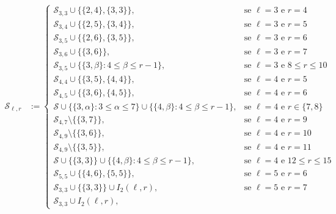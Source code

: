 \documentclass[12pt,a4paper]{book}
\begin{document}
\begin{equation*}%
    \begin{aligned}
        \mathcal{S}_{\ell, r}
            &:=
    \begin{cases}
        \mathcal{S}_{3,3} \cup \{\{2,4\}, \{3,3\}\}, 
        & \text{se } \ell=3 \text{ e } r=4   \\ 
        \mathcal{S}_{3,4} \cup \{\{2,5\}, \{3,4\}\}, 
        & \text{se } \ell=3 \text{ e } r=5    \\ 
        \mathcal{S}_{3,5} \cup \{\{2,6\}, \{3,5\}\}, 
        & \text{se } \ell=3 \text{ e } r=6    \\ 
         \mathcal{S}_{3,6} \cup \{\{3,6\}\}, 
        & \text{se } \ell=3 \text{ e } r=7    \\ 
        \mathcal{S}_{3,5} \cup \{\{3,\beta\}: 4 \leq \beta \leq r-1\}, & \text{se } \ell =3 \text{ e } 8\leq r \leq 10 \\
         \mathcal{S}_{4,4} \cup \{\{3,5\}, \{4,4\}\}, 
        & \text{se } \ell=4 \text{ e } r=5      \\ 
         \mathcal{S}_{4,5} \cup \{\{3,6\}, \{4,5\}\}, 
        & \text{se } \ell=4 \text{ e } r=6      \\ 
         \mathcal{S} \cup \{\{3,\alpha\}: 3\leq\alpha\leq7\}\cup \{\{4,\beta\}: 4\leq \beta\leq r-1\}, 
        & \text{se } \ell=4 \text{ e } r\in\{7,8\}      \\ 
        \mathcal{S}_{4,7} \setminus\{\{3,7\}\}, 
        & \text{se } \ell=4 \text{ e } r=9      \\ 
         \mathcal{S}_{4,9} \setminus\{\{3,6\}\}, 
        & \text{se } \ell=4 \text{ e } r=10      \\ 
         \mathcal{S}_{4,9} \setminus\{\{3,5\}\}, 
        & \text{se } \ell=4 \text{ e } r=11      \\ 
         \mathcal{S} \cup \{\{3,3\}\} \cup \{\{4,\beta\}: 4\leq \beta\leq r-1\}, 
        & \text{se } \ell=4 \text{ e } 12\leq r\leq 15     \\ 
         \mathcal{S}_{5,5} \cup \{\{4,6\}, \{5,5\}\}, 
        & \text{se } \ell=5 \text{ e } r=6     \\
         \mathcal{S}_{3,3} \cup \{\{3,3\}\}\cup I_2(\ell,r), 
        & \text{se } \ell=5 \text{ e } r=7    \\
         \mathcal{S}_{3,3} \cup I_2(\ell,r), 

\end{cases}
\end{aligned}
\end{equation*}
\end{document}

